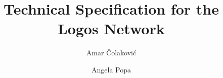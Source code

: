 \title{Technical Specification for the Logos Network}
\author[1]{Amar Čolaković}
\author[1]{Angela Popa}
\author[2]{}
\affil[2]{}
\date{}

\newcommand{\releasehistory}{
	\subsubsection*{\normalsize Release History}
	{\small
	\begin{tabbing}
		\hspace{1.3cm} \= \hspace{2.3cm} \= \kill
		\textbf{Version} \> \textbf{Date} \> \textbf{Changes} \\
		0.0.x \> xx, xx 2025 \> ... \\
	\end{tabbing}
	}
}